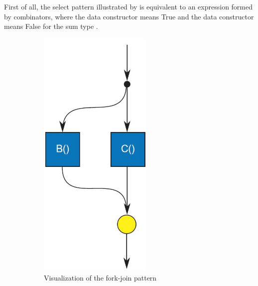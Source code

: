 First of all, the select pattern illustrated by  is equivalent to an expression formed by \hask{|||} combinators, where the data constructor  means True and the data constructor  means False for the sum type .
\begin{figure}[ht]
    \begin{subfigure}[b]{0.475\textwidth}
       \centering
       \includegraphics[width=0.60\textwidth]{arrow/fork.png}
        \caption{Visualization of the fork-join pattern \cite{mccoolStructuredParallelPrograming2012}}
        \label{SArrow:fig:fork}
    \end{subfigure}
    \hfill
   \begin{subfigure}[b]{0.475\textwidth}
        \centering

\end{subfigure}
\end{figure}
